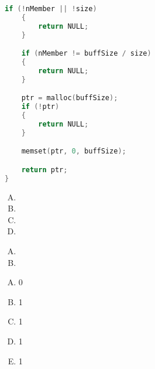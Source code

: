 {\begin{practicec}
\begin{codelist}
\begin{lstlisting}[language=C]
    if (!nMember || !size)
    {
        return NULL;
    }

    if (nMember != buffSize / size)
    {
        return NULL;
    }

    ptr = malloc(buffSize);
    if (!ptr)
    {
        return NULL;
    }

    memset(ptr, 0, buffSize);

    return ptr;
}
            \end{lstlisting}
        \end{codelist}
    \end{practicec}

    \begin{practicec}
        \begin{enumerate}[A.]
            \item {}
            \item {}
            \item {}
            \item {}
        \end{enumerate}
    \end{practicec}

    \begin{practicec}

    \end{practicec}

    \begin{practicec}

    \end{practicec}

    \begin{practicec}

    \end{practicec}

    \begin{practicec}
        \begin{enumerate}[A.]
            \item {}
            \item {}
        \end{enumerate}
    \end{practicec}

    \begin{practicec}
        \begin{enumerate}[A.]
            \item 0
            \item 1
            \item 1
            \item 1
            \item 1
        \end{enumerate}
    \end{practicec}

}
